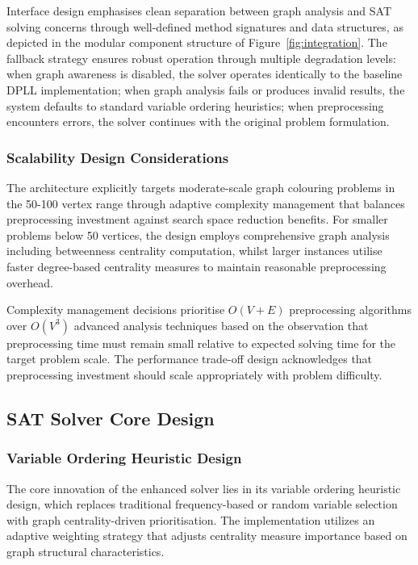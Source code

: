 Interface design emphasises clean separation between graph analysis and SAT solving concerns through well-defined method signatures and data structures, as depicted in the modular component structure of Figure~\ref{fig:integration}. The fallback strategy ensures robust operation through multiple degradation levels: when graph awareness is disabled, the solver operates identically to the baseline DPLL implementation; when graph analysis fails or produces invalid results, the system defaults to standard variable ordering heuristics; when preprocessing encounters errors, the solver continues with the original problem formulation.

\subsubsection{Scalability Design Considerations}

The architecture explicitly targets moderate-scale graph colouring problems in the 50-100 vertex range through adaptive complexity management that balances preprocessing investment against search space reduction benefits. For smaller problems below 50 vertices, the design employs comprehensive graph analysis including betweenness centrality computation, whilst larger instances utilise faster degree-based centrality measures to maintain reasonable preprocessing overhead.

Complexity management decisions prioritise $O(V+E)$ preprocessing algorithms over $O(V^3)$ advanced analysis techniques based on the observation that preprocessing time must remain small relative to expected solving time for the target problem scale. The performance trade-off design acknowledges that preprocessing investment should scale appropriately with problem difficulty.

\subsection{SAT Solver Core Design}

\subsubsection{Variable Ordering Heuristic Design}

The core innovation of the enhanced solver lies in its variable ordering heuristic design, which replaces traditional frequency-based or random variable selection with graph centrality-driven prioritisation. The implementation utilizes an adaptive weighting strategy that adjusts centrality measure importance based on graph structural characteristics.

